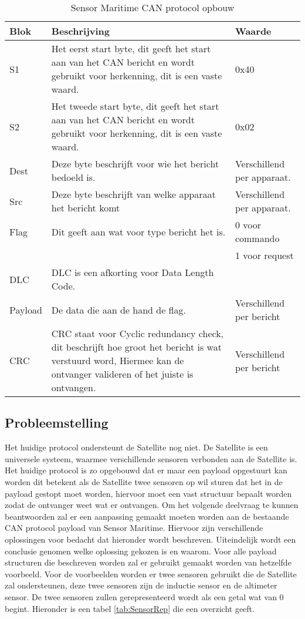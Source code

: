 \begin{table}[h!]
	\caption{Sensor Maritime CAN protocol opbouw}
	\label{tab:cansensorprotocol}
	\begin{tabular}{p{1.5cm}p{10.5cm}p{3cm}}
	\toprule
	\textbf{Blok} & \textbf{Beschrijving} & \textbf{Waarde}\\ \midrule
	S1		& Het eerst start byte, dit geeft het start aan van het CAN bericht en wordt gebruikt voor herkenning, dit is een vaste waard.	& 0x40 \\
	S2		& Het tweede start byte, dit geeft het start aan van het CAN bericht en wordt gebruikt voor herkenning, dit is een vaste waard. & 0x02 \\
	Dest	& Deze byte beschrijft voor wie het bericht bedoeld is.		& Verschillend per apparaat. \\
	Src		& Deze byte beschrijft van welke apparaat het bericht komt	& Verschillend per apparaat.\\ 
	Flag	& Dit geeft aan wat voor type bericht het is.             & 0 voor commando \\ 
			& & 1 voor request \\ 
	DLC		& DLC is een afkorting voor Data Length Code.             & \\ 
	Payload	& De data die aan de hand de flag. & Verschillend per bericht\\
	CRC		& CRC staat voor Cyclic redundancy check, dit beschrijft hoe groot het bericht is wat verstuurd word, Hiermee kan de ontvanger valideren of het juiste is ontvangen. & Verschillend per bericht\\ \bottomrule
	\end{tabular}
\end{table}

\subsection{Probleemstelling}
Het huidige protocol ondersteunt de Satellite nog niet. De Satellite is een universele systeem, waarmee verschillende sensoren verbonden aan de Satellite is. Het huidige protocol is zo opgebouwd dat er maar een payload opgestuurt kan worden dit betekent als de Satellite twee sensoren op wil sturen dat het in de payload gestopt moet worden, hiervoor moet een vast structuur bepaalt worden zodat de ontvanger weet wat er ontvangen. Om het volgende deelvraag te kunnen beantwoorden zal er een aanpassing gemaakt moeten worden aan de bestaande CAN protocol payload van Sensor Maritime. Hiervoor zijn verschillende oplossingen voor bedacht dat hieronder wordt beschreven. Uiteindelijk wordt een conclusie genomen welke oplossing gekozen is en waarom. Voor alle payload structuren die beschreven worden zal er gebruikt gemaakt worden van hetzelfde voorbeeld. Voor de voorbeelden worden er twee sensoren gebruikt die de Satellite zal ondersteunen, deze twee sensoren zijn de inductie sensor en de altimeter sensor. De twee sensoren zullen gerepresenteerd wordt als een getal wat van 0 begint. Hieronder is een tabel \ref{tab:SensorRep} die een overzicht geeft.

